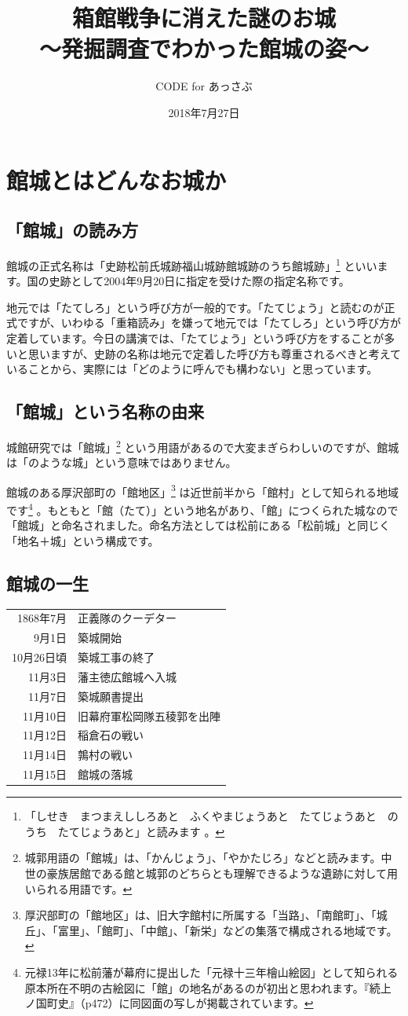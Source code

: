 \documentclass[11pt,report]{jsbook}
\title{箱館戦争に消えた謎のお城\\{\large 〜発掘調査でわかった館城の姿〜}} %
\date{2018年7月27日}
\author{CODE for あっさぶ}              %
\begin{document}
 
\maketitle
\chapter{館城とはどんなお城か}
\section{「館城」の読み方}
館城の正式名称は「史跡松前氏城跡福山城跡館城跡のうち館城跡」\footnote{
「しせき　まつまえししろあと　ふくやまじょうあと　たてじょうあと　のうち　たてじょうあと」と読みます
。}
といいます。国の史跡として2004年9月20日に指定を受けた際の指定名称です。

地元では「たてしろ」という呼び方が一般的です。「たてじょう」と読むのが正式ですが、いわゆる「重箱読み」を嫌って地元では「たてしろ」という呼び方が定着しています。今日の講演では、「たてじょう」という呼び方をすることが多いと思いますが、史跡の名称は地元で定着した呼び方も尊重されるべきと考えていることから、実際には「どのように呼んでも構わない」と思っています。

\section{「館城」という名称の由来}
城館研究では「館城」\footnote{
城郭用語の「館城」は、「かんじょう」、「やかたじろ」などと読みます。中世の豪族居館である館と城郭のどちらとも理解できるような遺跡に対して用いられる用語です。
}
という用語があるので大変まぎらわしいのですが、館城は「のような城」という意味ではありません。

館城のある厚沢部町の「館地区」\footnote{
厚沢部町の「館地区」は、旧大字館村に所属する「当路」、「南館町」、「城丘」、「富里」、「館町」、「中館」、「新栄」などの集落で構成される地域です。
}
は近世前半から「館村」として知られる地域です\footnote{
元禄13年に松前藩が幕府に提出した「元禄十三年檜山絵図」として知られる原本所在不明の古絵図に「館」の地名があるのが初出と思われます。『続上ノ国町史』（p472）に同図面の写しが掲載されています。
}
。もともと「館（たて）」という地名があり、「館」につくられた城なので「館城」と命名されました。命名方法としては松前にある「松前城」と同じく「地名＋城」という構成です。

\newpage
\section{館城の一生}
\begin{tabular}{r l}
1868年7月&正義隊のクーデター\\
9月1日&築城開始\\
10月26日頃&築城工事の終了\\
11月3日&藩主徳広館城へ入城\\
11月7日&築城願書提出\\
11月10日&旧幕府軍松岡隊五稜郭を出陣\\
11月12日&稲倉石の戦い\\
11月14日&鶉村の戦い\\
11月15日&館城の落城\\
\end{tabular}
\end{document}
